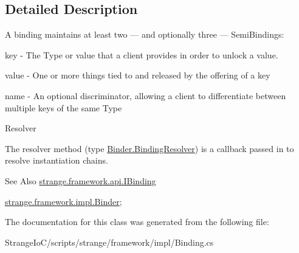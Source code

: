 \subsection{Detailed Description}
A binding maintains at least two — and optionally three — Semi\-Bindings\-: 


\begin{DoxyItemize}
\item key -\/ The Type or value that a client provides in order to unlock a value. 
\item value -\/ One or more things tied to and released by the offering of a key 
\item name -\/ An optional discriminator, allowing a client to differentiate between multiple keys of the same Type 
\end{DoxyItemize}

Resolver

The resolver method (type \hyperlink{classstrange_1_1framework_1_1impl_1_1_binder_aa4e977fc31063ca4d0b029b1abe39dad}{Binder.\-Binding\-Resolver}) is a callback passed in to resolve instantiation chains.

\begin{DoxySeeAlso}{See Also}
\hyperlink{interfacestrange_1_1framework_1_1api_1_1_i_binding}{strange.\-framework.\-api.\-I\-Binding} 

\hyperlink{classstrange_1_1framework_1_1impl_1_1_binder}{strange.\-framework.\-impl.\-Binder}; 
\end{DoxySeeAlso}


The documentation for this class was generated from the following file\-:\begin{DoxyCompactItemize}
\item 
Strange\-Io\-C/scripts/strange/framework/impl/Binding.\-cs\end{DoxyCompactItemize}
